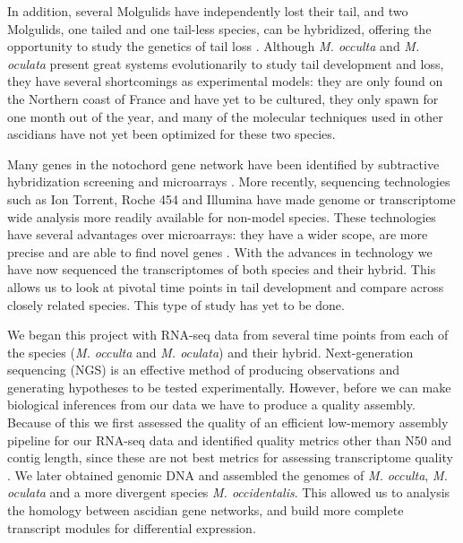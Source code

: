 In addition, several Molgulids have independently lost their tail, and two Molgulids, one tailed and one tail-less species, can be hybridized, offering the opportunity to study the genetics of tail loss \cite{jeffery_evolutionary_1991}. Although \textit{M. occulta} and \textit{M. oculata} present great systems evolutionarily to study tail development and loss, they have several shortcomings as experimental models: they are only found on the Northern coast of France and have yet to be cultured, they only spawn for one month out of the year, and many of the molecular techniques used in other ascidians have not yet been optimized for these two species.

Many genes in the notochord gene network have been identified by subtractive hybridization screening and microarrays \cite{jeffery_factors_1992,hotta_characterization_2000,gyoja_analysis_2007,kobayashi_differential_2013}. More recently, sequencing technologies such as Ion Torrent, Roche 454 and Illumina have made genome or transcriptome wide analysis more readily available for non-model species. These technologies have several advantages over microarrays: they have a wider scope, are more precise and are able to find novel genes \cite{marioni_rna-seq:_2008}. With the advances in technology we have now sequenced the transcriptomes of both species and their hybrid. This allows us to look at pivotal time points in tail development and compare across closely related species. This type of study has yet to be done. 

We began this project with RNA-seq data from several time points from each of the species (\textit{M. occulta} and \textit{M. oculata}) and their hybrid. Next-generation sequencing (NGS) is an effective method of producing observations and generating hypotheses to be tested experimentally. However, before we can make biological inferences from our data we have to produce a quality assembly. Because of this we first assessed the quality of an efficient low-memory assembly pipeline for our RNA-seq data and identified quality metrics other than N50 and contig length, since these are not best metrics for assessing transcriptome quality \cite{oneil_assessing_2013}. We later obtained genomic DNA and assembled the genomes of \textit{M. occulta}, \textit{M. oculata} and a more divergent species \textit{M. occidentalis}. This allowed us to analysis the homology between ascidian gene networks, and build more complete transcript modules for differential expression\cite{vijay_challenges_2012}.

